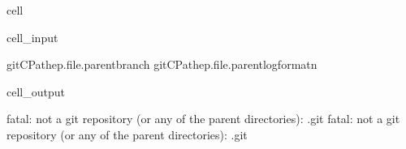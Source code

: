 \documentclass[letterpaper,table,10pt,english]{jupyterBook}
\begin{document}
\begin{sphinxuseclass}{cell}\begin{sphinxVerbatimInput}

\begin{sphinxuseclass}{cell_input}
\begin{sphinxVerbatim}[commandchars=\\\{\}]
git\PYGZhy{}CPathep.\PYGZus{}\PYGZus{}file\PYGZus{}\PYGZus{}.parentbranch
git\PYGZhy{}CPathep.\PYGZus{}\PYGZus{}file\PYGZus{}\PYGZus{}.parentlog\PYGZhy{}\PYGZhy{}format\PYGZhy{}n
\end{sphinxVerbatim}

\end{sphinxuseclass}\end{sphinxVerbatimInput}
\begin{sphinxVerbatimOutput}

\begin{sphinxuseclass}{cell_output}
\begin{sphinxVerbatim}[commandchars=\\\{\}]
fatal: not a git repository (or any of the parent directories): .git
fatal: not a git repository (or any of the parent directories): .git
\end{sphinxVerbatim}

\end{sphinxuseclass}\end{sphinxVerbatimOutput}

\end{sphinxuseclass}
\end{document}
